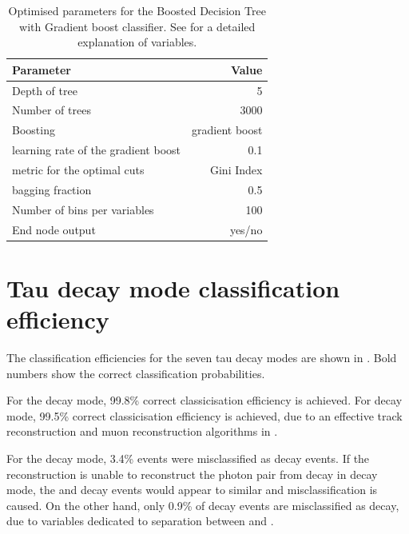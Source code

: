 \begin{table}[!htbp]\centering
\begin{tabular}{lr}
\hline \hline
 Parameter &  Value \\
\hline
Depth of tree & 5 \\
Number of trees & 3000 \\
Boosting & gradient boost \\
learning rate of the gradient boost & 0.1 \\
metric for the optimal cuts & Gini Index \\
bagging fraction & 0.5 \\
Number of bins per variables & 100 \\
End node output & yes/no \\
\hline \hline
\end{tabular}

\caption
{Optimised parameters for the Boosted Decision Tree with Gradient boost \multiclass classifier. See  for a detailed explanation of variables.}
\label{tab:tauBDTparameters}
\end{table}


\section{Tau decay mode classification efficiency}
\label{sec:tauClassificationEff}
The classification efficiencies for the seven tau decay modes are shown in . Bold numbers show the correct classification probabilities.


For the \decayElectronShort decay mode,   99.8\%  correct classicisation efficiency is achieved. For \decayMuonShort decay mode,  99.5\% correct classicisation efficiency is achieved, due to an effective track reconstruction and muon reconstruction algorithms in \pandora.

For the \decayPionShort decay mode, 3.4\% events were misclassified as \decayRhoShortest decay events. If the reconstruction is unable to reconstruct the photon pair from \Ppizero decay in \decayRhoShortest decay mode, the \decayPionShort and \decayRhoShortest decay events would appear to  similar and misclassification is caused. On the other hand, only 0.9\% of \decayPionShort decay events are misclassified as \decayElectronShort decay, due to variables dedicated to separation between \Pem and \Ppiminus.

